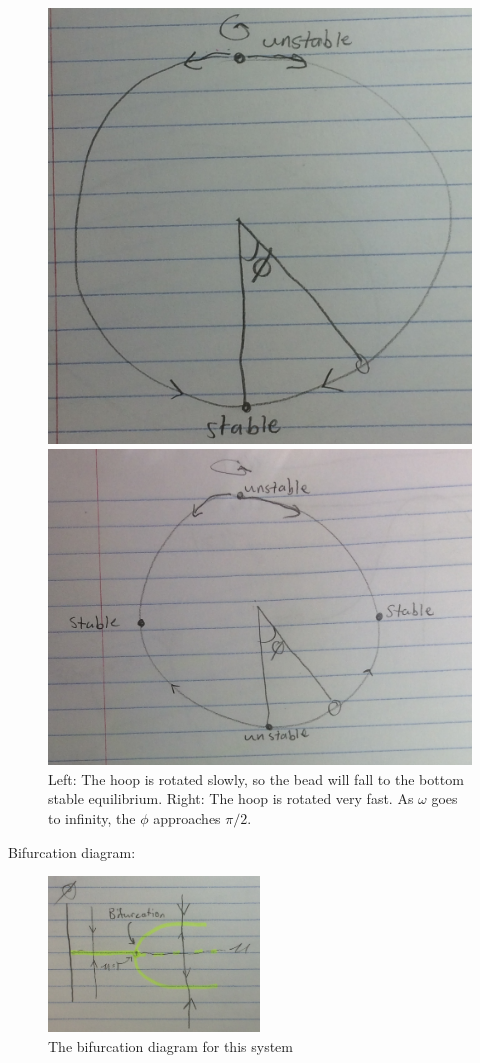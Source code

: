 \documentclass[main.tex]{subfiles}
\begin{document}
\begin{figure}
\begin{multicols}{2}
    \includegraphics[width=\linewidth]{hoop-bead-low-omega}\par
    \includegraphics[width=\linewidth]{hoop-bead-high-omega}\par
\end{multicols}
\caption{Left: The hoop is rotated slowly, so the bead will fall to the bottom stable equilibrium.
         Right: The hoop is rotated very fast. As $\omega$ goes to infinity, the $\phi$ approaches $\pi/2$.}
\end{figure}

Bifurcation diagram:
\begin{figure}[ht]
        \centering
        \includegraphics[width=0.5\textwidth]{hoop-bead-phi-of-miu}
        \caption{The bifurcation diagram for this system}
        \label{fig:hoop-bead-bifurcation}
\end{figure}
\end{document}
